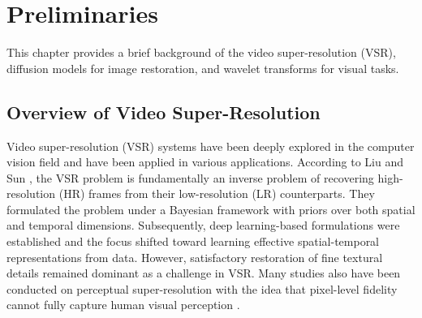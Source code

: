 \chapter{Preliminaries}{}{}
\label{CH:PRELIM}%

This chapter provides a brief background of the video 
super-resolution (VSR), diffusion models for image restoration, 
and wavelet transforms for visual tasks. 


\section{Overview of Video Super-Resolution}

Video super-resolution (VSR) systems have been deeply explored 
in the computer vision field and have been applied in various 
applications. According to Liu and Sun \cite{liu2013vid4}, the 
VSR problem is fundamentally an inverse problem of recovering 
high-resolution (HR) frames from their low-resolution (LR) 
counterparts. They formulated the problem under a Bayesian 
framework with priors over both spatial and temporal 
dimensions. Subsequently, deep learning-based formulations were 
established \cite{kappeler2016vsrnet} and the focus shifted 
toward learning effective spatial-temporal representations 
from data. However, satisfactory restoration of fine textural 
details remained dominant \cite{caballero2017vespcn} as a 
challenge in VSR. Many studies also have been conducted on 
perceptual super-resolution with the idea that pixel-level 
fidelity cannot fully capture human visual perception 
\cite{ledig2017srgan, wang2018esrgan, wang2021realbasicvsr, 
chan2022basicvsrplusplus, rota2024stablevsr}.


